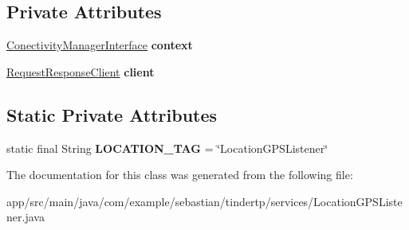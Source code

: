 \subsection*{Private Attributes}
\begin{DoxyCompactItemize}
\item 
\hyperlink{interfacecom_1_1example_1_1sebastian_1_1tindertp_1_1Interfaces_1_1ConectivityManagerInterface}{Conectivity\+Manager\+Interface} {\bfseries context}\hypertarget{classcom_1_1example_1_1sebastian_1_1tindertp_1_1services_1_1LocationGPSListener_ae8dc549b33e7d1f111d3f601f1931c14}{}\label{classcom_1_1example_1_1sebastian_1_1tindertp_1_1services_1_1LocationGPSListener_ae8dc549b33e7d1f111d3f601f1931c14}

\item 
\hyperlink{classcom_1_1example_1_1sebastian_1_1tindertp_1_1internetTools_1_1RequestResponseClient}{Request\+Response\+Client} {\bfseries client}\hypertarget{classcom_1_1example_1_1sebastian_1_1tindertp_1_1services_1_1LocationGPSListener_a891a4d088af3687a153941ee77672f6e}{}\label{classcom_1_1example_1_1sebastian_1_1tindertp_1_1services_1_1LocationGPSListener_a891a4d088af3687a153941ee77672f6e}

\end{DoxyCompactItemize}
\subsection*{Static Private Attributes}
\begin{DoxyCompactItemize}
\item 
static final String {\bfseries L\+O\+C\+A\+T\+I\+O\+N\+\_\+\+T\+AG} = \char`\"{}Location\+G\+P\+S\+Listener\char`\"{}\hypertarget{classcom_1_1example_1_1sebastian_1_1tindertp_1_1services_1_1LocationGPSListener_a547967ba1dca7b23f34a477f6beb7a14}{}\label{classcom_1_1example_1_1sebastian_1_1tindertp_1_1services_1_1LocationGPSListener_a547967ba1dca7b23f34a477f6beb7a14}

\end{DoxyCompactItemize}


The documentation for this class was generated from the following file\+:\begin{DoxyCompactItemize}
\item 
app/src/main/java/com/example/sebastian/tindertp/services/Location\+G\+P\+S\+Listener.\+java\end{DoxyCompactItemize}
